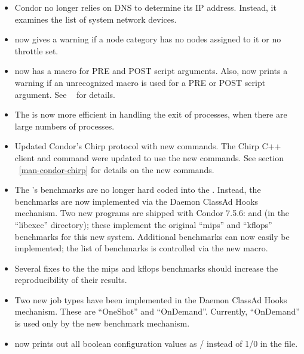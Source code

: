 \begin{itemize}

\item Condor no longer relies on DNS to determine its IP address.
  Instead, it examines the list of system network devices.

\item {} now gives a warning if a node category has no
nodes assigned to it or no throttle set.

\item {} now has a  macro for PRE and
POST script arguments.
Also,  now prints a warning if an unrecognized macro is
used for a PRE or POST script argument.
See ~\pageref{dagman:SCRIPT} for details.

\item The  is now more efficient in handling the exit of
   processes, when there are large numbers of 
   processes.

\item Updated Condor's Chirp protocol with new commands. The Chirp C++ client
 and  command were updated to use the new commands. See section
 ~\ref{man-condor-chirp} for details on the new commands.

\item The 's benchmarks are no longer hard coded into
  the .  Instead, the benchmarks are now implemented
  via the Daemon ClassAd Hooks mechanism.  Two new programs are
  shipped with Condor 7.5.6:  and  (in the
  ``libexec'' directory); these implement the original ``mips'' and
  ``kflops'' benchmarks for this new system.  Additional benchmarks
  can now easily be implemented; the list of benchmarks is controlled
  via the new  macro.

\item Several fixes to the the mips and kflops benchmarks should
  increase the reproducibility of their results.

\item Two new job types have been implemented in the Daemon ClassAd
  Hooks mechanism.  These are ``OneShot'' and ``OnDemand''.
  Currently, ``OnDemand'' is used only by the new benchmark mechanism.

\item {} now prints  out all boolean configuration
values as / instead of 1/0 in the
 file.


\end{itemize}
